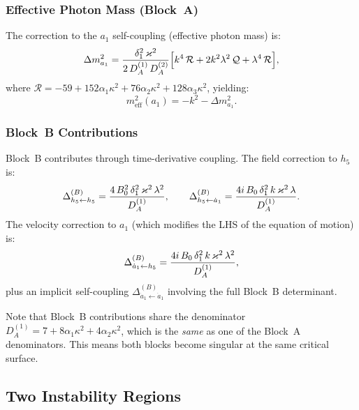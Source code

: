 \subsubsection{Effective Photon Mass (Block~A)}
\label{subsec:effective-mass-a}

The correction to the $a_1$ self-coupling (effective photon mass) is:
\begin{equation}
  \Delta m^2_{a_1} = \frac{\delta_1^2\,\kappa^2}{2\, D_A^{(1)}\, D_A^{(2)}}
  \Bigl[
    k^4\, \mathcal{R}
    + 2 k^2 \lambda^2\, \mathcal{Q}
    + \lambda^4\, \mathcal{R}
  \Bigr],
  \label{eq:mass-shift-a}
\end{equation}
where $\mathcal{R} = -59 + 152\alpha_1\kappa^2 + 76\alpha_2\kappa^2 + 128\alpha_3\kappa^2$, yielding:
\begin{equation}
  m^2_{\text{eff}}(a_1) = -k^2 - \Delta m^2_{a_1}.
  \label{eq:m2-eff-a1}
\end{equation}

\subsubsection{Block~B Contributions}
\label{subsec:block-b}

Block~B contributes through time-derivative coupling. The field correction to $h_5$ is:
\begin{equation}
  \Delta^{(B)}_{h_5 \leftarrow h_5} = \frac{4\,\Bzero^2\,\delta_1^2\,\kappa^2\,\lambda^2}{D_A^{(1)}},
  \qquad
  \Delta^{(B)}_{h_5 \leftarrow \dot{a}_1} = \frac{4i\,\Bzero\,\delta_1^2\,k\,\kappa^2\,\lambda}{D_A^{(1)}}.
  \label{eq:block-b-h5}
\end{equation}
The velocity correction to $a_1$ (which modifies the LHS of the equation of motion) is:
\begin{equation}
  \Delta^{(B)}_{\dot{a}_1 \leftarrow h_5} = \frac{4i\,\Bzero\,\delta_1^2\,k\,\kappa^2\,\lambda^2}{D_A^{(1)}},
  \label{eq:block-b-a1-h5}
\end{equation}
plus an implicit self-coupling $\Delta^{(B)}_{\dot{a}_1 \leftarrow \dot{a}_1}$ involving the full Block~B determinant.

Note that Block~B contributions share the denominator $D_A^{(1)} = 7 + 8\alpha_1\kappa^2 + 4\alpha_2\kappa^2$, which is the \emph{same} as one of the Block~A denominators. This means both blocks become singular at the same critical surface.

\subsection{Two Instability Regions}
\label{subsec:instabilities}

